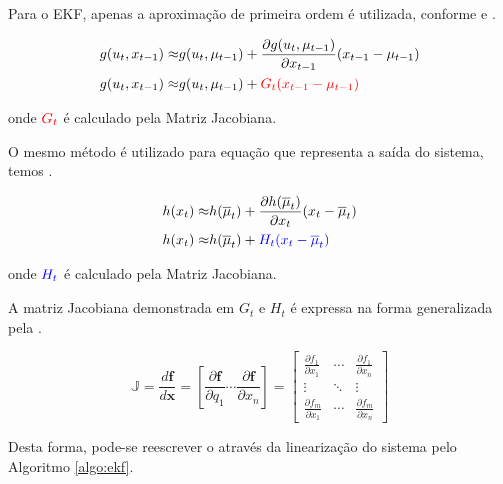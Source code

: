 Para o EKF, apenas a aproximação de primeira ordem é utilizada, conforme  e .

\begin{equation}
    \label{eq:taylor2}
    \begin{split}
        g(u_t, x_{t-1}) \approx & g(u_t, \mu_{t-1}) + \frac{\partial g(u_t, \mu_{t-1}) }{\partial x_{t-1}}(x_{t-1}-\mu_{t-1}) \\
        g(u_t, x_{t-1}) \approx & g(u_t, \mu_{t-1}) + \color{red}{G_t}(x_{t-1}-\mu_{t-1})
    \end{split}
\end{equation}

\noindent onde $\color{red}G_t$ é calculado pela Matriz Jacobiana.

O mesmo método é utilizado para equação que representa a saída do sistema, temos .

\begin{equation}
    \label{eq:taylor4}
    \begin{split}
        h(x_t) \approx & h(\overline{\mu}_t) + \frac{\partial h(\overline{\mu}_t) }{\partial x_{t}}(x_{t}-\overline{\mu}_{t}) \\
        h(x_t) \approx & h(\overline{\mu}_t) + \color{blue}{H_t}(x_{t}-\overline{\mu}_{t})
    \end{split}
\end{equation}

\noindent onde $\color{blue}H_t$ é calculado pela Matriz Jacobiana.

A matriz Jacobiana demonstrada em $G_t$ e $H_t$ é expressa na forma generalizada pela .

\begin{equation}
    \label{eq:taylor5}
    \mathbb{J}
    =
    \frac{d \mathbf{f}}{d \mathbf{x}}
    =
    \left[ \frac{\partial \mathbf{f}}{\partial q_1}
        \cdots \frac{\partial \mathbf{f}}{\partial x_n} \right]
    =
    \begin{bmatrix}
        \frac{\partial f_1}{\partial x_1} & \cdots &
        \frac{\partial f_1}{\partial x_n}                   \\
        \vdots                            & \ddots & \vdots \\
        \frac{\partial f_m}{\partial x_1} & \cdots &
        \frac{\partial f_m}{\partial x_n}
    \end{bmatrix}
\end{equation}

Desta forma, pode-se reescrever o  através da linearização do sistema pelo Algoritmo \ref{algo:ekf}.

